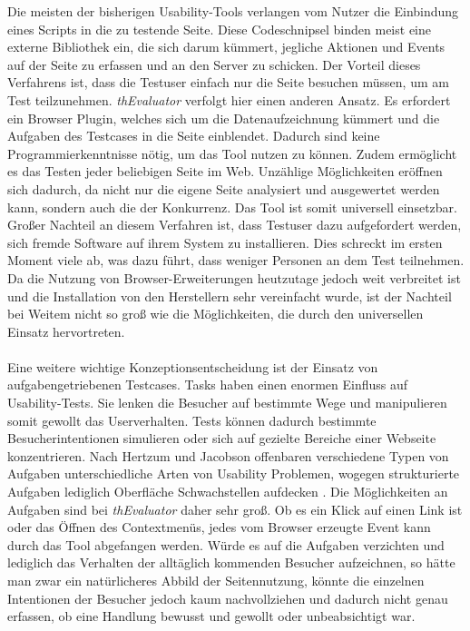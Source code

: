 Die meisten der bisherigen Usability-Tools verlangen vom Nutzer die Einbindung eines Scripts in die zu testende Seite. Diese Codeschnipsel binden meist eine externe Bibliothek ein, die sich darum kümmert, jegliche Aktionen und Events auf der Seite zu erfassen und an den Server zu schicken. Der Vorteil dieses Verfahrens ist, dass die Testuser einfach nur die Seite besuchen müssen, um am Test teilzunehmen. \textit{thEvaluator} verfolgt hier einen anderen Ansatz. Es erfordert ein Browser Plugin, welches sich um die Datenaufzeichnung kümmert und die Aufgaben des Testcases in die Seite einblendet. Dadurch sind keine Programmierkenntnisse nötig, um das Tool nutzen zu können. Zudem ermöglicht es das Testen jeder beliebigen Seite im Web. Unzählige Möglichkeiten eröffnen sich dadurch, da nicht nur die eigene Seite analysiert und ausgewertet werden kann, sondern auch die der Konkurrenz. Das Tool ist somit universell einsetzbar. Großer Nachteil an diesem Verfahren ist, dass Testuser dazu aufgefordert werden, sich fremde Software auf ihrem System zu installieren. Dies schreckt im ersten Moment viele ab, was dazu führt, dass weniger Personen an dem Test teilnehmen. Da die Nutzung von Browser-Erweiterungen heutzutage jedoch weit verbreitet ist und die Installation von den Herstellern sehr vereinfacht wurde, ist der Nachteil bei Weitem nicht so groß wie die Möglichkeiten, die durch den universellen Einsatz hervortreten.\\
\\
Eine weitere wichtige Konzeptionsentscheidung ist der Einsatz von aufgabengetriebenen Testcases. Tasks haben einen enormen Einfluss auf Usability-Tests. Sie lenken die Besucher auf bestimmte Wege und manipulieren somit gewollt das Userverhalten. Tests können dadurch bestimmte Besucherintentionen simulieren oder sich auf gezielte Bereiche einer Webseite konzentrieren. Nach Hertzum und Jacobson offenbaren verschiedene Typen von Aufgaben unterschiedliche Arten von Usability Problemen, wogegen strukturierte Aufgaben lediglich Oberfläche Schwachstellen aufdecken \cite{anzahlTestpersonen}. Die Möglichkeiten an Aufgaben sind bei \textit{thEvaluator} daher sehr groß. Ob es ein Klick auf einen Link ist oder das Öffnen des Contextmenüs, jedes vom Browser erzeugte Event kann durch das Tool abgefangen werden. Würde es auf die Aufgaben verzichten und lediglich das Verhalten der alltäglich kommenden Besucher aufzeichnen, so hätte man zwar ein natürlicheres Abbild der Seitennutzung, könnte die einzelnen Intentionen der Besucher jedoch kaum nachvollziehen und dadurch nicht genau erfassen, ob eine Handlung bewusst und gewollt oder unbeabsichtigt war.\\
